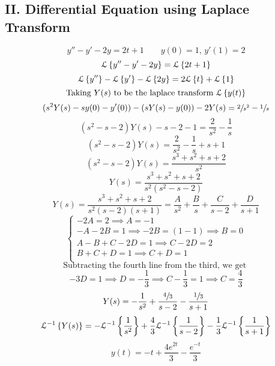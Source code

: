 \documentclass[12pt]{article}
\begin{document}
    \subsection*{II. Differential Equation using Laplace Transform}
    \[
        y'' - y' - 2y  = 2t + 1 \qquad y(0) = 1, \, y'(1) = 2
    \]
    \[
        \mathcal{L}\left\{y'' - y' - 2y\right\} = \mathcal{L}\left\{2t+1\right\}
    \]
    \[
        \mathcal{L}\left\{y''\right\} - \mathcal{L}\left\{y'\right\} - \mathcal{L}\left\{2y\right\} 
        = 2\mathcal{L}\left\{t\right\} + \mathcal{L}\left\{1\right\}
    \]
    \[
        \text{Taking } Y(s)
        \text{ to be the laplace transform } \mathcal{L}\left\{y(t)\right\}
    \]
    \[
        (s^2Y(s) - sy(0) - y'(0))
        - (sY(s) - y(0)) - 2Y(s)
        = \sfrac{2}{s^2} - \sfrac{1}{s}
    \]
    \[
        (s^2-s-2)Y(s) - s - 2 - 1 = \dfrac{2}{s^2} - \dfrac{1}{s}
    \]
    \[
        (s^2-s-2)Y(s) = \dfrac{2}{s^2} - \dfrac{1}{s} + s + 1
    \]
    \[
        (s^2-s-2)Y(s) = \dfrac{s^3 + s^2 + s + 2}{s^2}
    \]
    \[
        Y(s) = \dfrac{s^3 + s^2 + s + 2}{s^2(s^2-s-2)}
    \]
    \[
        Y(s) = \dfrac{s^3 + s^2 + s + 2}{s^2(s-2)(s+1)}
        = \dfrac{A}{s^2} + \dfrac{B}{s} + \dfrac{C}{s-2} + \dfrac{D}{s+1}
    \]
    \[
        \begin{cases}
            -2A = 2 \implies A = -1 \\
            -A - 2B = 1 \implies -2B = (1-1) \implies B = 0 \\
            A - B + C -2D = 1 \implies C - 2D = 2 \\
            B + C + D = 1 \implies C + D = 1 \\
        \end{cases}
    \]
    \[ \text{Subtracting the fourth line from the third, we get } \]
    \[
        -3D = 1 \implies D = -\dfrac{1}{3}
        \implies C - \dfrac{1}{3} = 1 \implies C = \dfrac{4}{3}
    \]
    \[
        Y(s) = -\dfrac{1}{s^2} + \dfrac{\sfrac{4}{3}}{s-2}
        - \dfrac{\sfrac{1}{3}}{s+1}
    \]
    \[
        \mathcal{L}^{-1}\left\{Y(s)\right\} = -\mathcal{L}^{-1}\left\{\dfrac{1}{s^2}\right\} 
        + \dfrac{4}{3}\mathcal{L}^{-1}\left\{\dfrac{1}{s-2}\right\}
        - \dfrac{1}{3}\mathcal{L}^{-1}\left\{\dfrac{1}{s+1}\right\}
    \]
    \[
        y(t) = -t + \dfrac{4e^{2t}}{3} - \dfrac{e^{-t}}{3}
    \]

    
\end{document}
